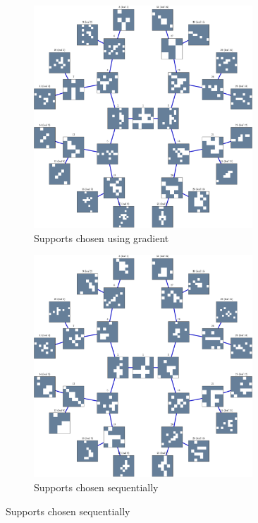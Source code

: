 \begin{figure}[!h] \centering
\begin{subfigure}[b]{0.49\textwidth}\centering
\includegraphics[width=0.9\textwidth]{figures/tree-learn/gradient-vs-sequential/xp_learnsupp256_curvelet_decomp3_tree-binary_dpth4_supp-diracs_usegrad1_every5_add5_totinit0_totadd279_alpha30_tree.pdf}
	\caption{Supports chosen using gradient}\label{fig_cmp_grad_tree}
\end{subfigure}
\begin{subfigure}[b]{0.49\textwidth}\centering
\includegraphics[width=0.9\textwidth]{figures/tree-learn/gradient-vs-sequential/xp_learnsupp256_curvelet_decomp3_tree-binary_dpth4_supp-diracs_usegrad0_every5_add5_totinit0_totadd279_alpha30_tree.pdf} 
	\caption{Supports chosen sequentially}\label{fig_cmp_seq_tree}
\end{subfigure}
\end{figure}
